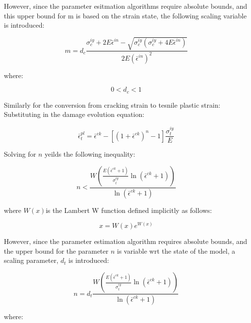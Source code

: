 However, since the parameter esitmation algorithms require absolute
bounds, and this upper bound for m is based on the strain state, the
following scaling variable is introduced:

\begin{equation}
m=d_{c}\frac{\sigma_{c}^{iy}+2E\bar{\epsilon}^{in}-\sqrt{\sigma_{c}^{iy}\left(\sigma_{c}^{iy}+4E\bar{\epsilon}^{in}\right)}}{2E\left(\bar{\epsilon}^{in}\right)^{2}}\label{eqn:param14}
\end{equation}


where:

\begin{equation}
0<d_{c}<1\label{eqn:param15}
\end{equation}


Similarly for the conversion from cracking strain to tesnile plastic
strain: Substituting in the damage evolution equation:

\begin{equation}
\bar{\epsilon}_{t}^{pl}=\bar{\epsilon}^{ck}-\left[\left(1+\bar{\epsilon}^{ck}\right)^{n}-1\right]\frac{\sigma_{t}^{iy}}{E}\label{eqn:param5-1}
\end{equation}


Solving for $n$ yeilds the following inequality:

\begin{equation}
n<\frac{W\left(\frac{E\left(\bar{\epsilon}^{ck}+1\right)}{\sigma_{t}^{iy}}\ln\left(\bar{\epsilon}^{ck}+1\right)\right)}{\ln\left(\bar{\epsilon}^{ck}+1\right)}\label{eqn:param7}
\end{equation}


where $W\left(x\right)$is the Lambert W function defined implicitly as follows:

\begin{equation}
x=W\left(x\right)e^{W(x)}\label{eqn:param8}
\end{equation}


However, since the parameter estimation algorithm requires absolute
bounds, and the upper bound for the parameter $n$ is variable wrt
the state of the model, a scaling parameter, $d_{t}$ is introduced:

\begin{equation}
n=d_{t}\frac{W\left(\frac{E\left(\bar{\epsilon}^{ck}+1\right)}{\sigma_{t}^{iy}}\ln\left(\bar{\epsilon}^{ck}+1\right)\right)}{\ln\left(\bar{\epsilon}^{ck}+1\right)}\label{eqn:param9}
\end{equation}


where:

